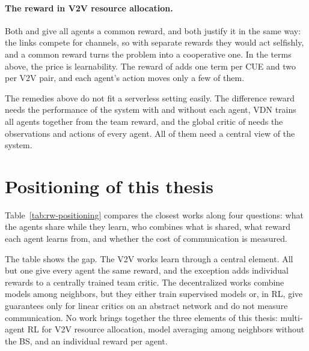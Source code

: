 \paragraph{The reward in V2V resource allocation.} Both \citet{liang+19spectrum} and
\citet{li+22fedmarl} give all agents a common reward, and both justify it in the same way: the links
compete for channels, so with separate rewards they would act selfishly, and a common reward turns the
problem into a cooperative one. In the terms above, the price is learnability. The reward of
\citet{li+22fedmarl} adds one term per \ac{CUE} and two per \ac{V2V} pair, and each agent's action moves
only a few of them.

The remedies above do not fit a serverless setting easily. The difference reward needs the performance of
the system with and without each agent, VDN trains all agents together from the team reward, and the global
critic of \citet{parvini+23aoi} needs the observations and actions of every agent. All of them need a
central view of the system.

\section{Positioning of this thesis}
\label{sec:rw-positioning}

Table~\ref{tab:rw-positioning} compares the closest works along four questions: what the agents share
while they learn, who combines what is shared, what reward each agent learns from, and whether the cost of
communication is measured.

The table shows the gap. The \ac{V2V} works learn through a central element. All but one give every agent
the same reward, and the exception adds individual rewards to a centrally trained team critic. The
decentralized works combine models among neighbors, but they either train supervised models
or, in \ac{RL}, give guarantees only for linear critics on an abstract network and do not measure
communication. No work brings
together the three elements of this thesis: multi-agent \ac{RL} for \ac{V2V} resource allocation, model
averaging among neighbors without the \ac{BS}, and an individual reward per agent.

